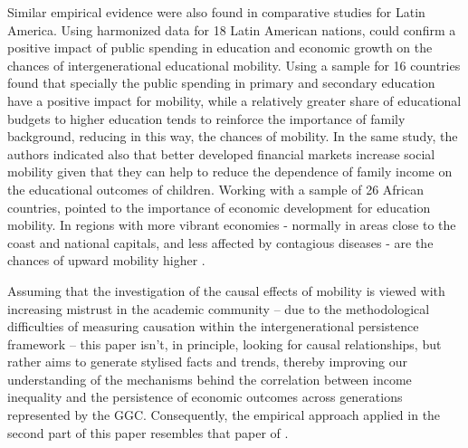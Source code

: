 \documentclass[a4paper, 12pt]{article}
\begin{document}
Similar empirical evidence were also found in comparative studies for Latin America. Using harmonized data for 18 Latin American nations, \citet{neidhofer2019intergenerational} could confirm a positive impact of public spending in education and economic growth on the chances of intergenerational educational mobility. Using a sample for 16 countries \citep{behrman2001intergenerational} found that specially the public spending in primary and secondary education have a positive impact for mobility, while a relatively greater share of educational budgets to higher education tends to reinforce the importance of family background, reducing in this way, the chances of mobility. In the same study, the authors indicated also that better developed financial markets increase social mobility given that they can help to reduce the dependence of family income on the educational outcomes of children. Working with a sample of 26 African countries, \citet{alesina2019intergenerational} pointed to the importance of economic development for education mobility. In regions with more vibrant economies - normally in areas close to the coast and national capitals, and less affected by contagious diseases - are the chances of upward mobility higher \citep{torche2019educational}.

 





 
 
Assuming that the investigation of the causal effects of mobility is viewed with increasing mistrust in the academic community – due to the methodological difficulties of measuring causation within the intergenerational persistence framework \citep{bjorklund2009intergenerational, fessler2012gender, chetty2014land} – this paper isn't, in principle, looking for causal relationships, but rather aims to generate stylised facts and trends, thereby improving our understanding of the mechanisms behind the correlation between income inequality and the persistence of economic outcomes across generations represented by the GGC. Consequently, the empirical approach applied in the second part of this paper resembles that paper of \citet{kearney2014income}.

\end{document}
